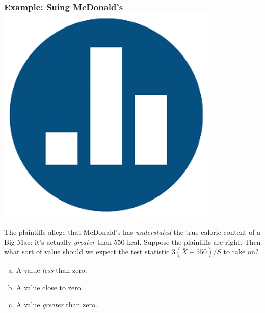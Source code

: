 \begin{frame}
\frametitle{Example: Suing McDonald's \hfill \includegraphics[scale = 0.05]{./images/clicker}}
The plaintiffs allege that McDonald's has \emph{understated} the true caloric content of a Big Mac: it's actually \emph{greater} than 550 kcal. \alert{Suppose the plaintiffs are right. Then what sort of value should we expect the test statistic $3(\bar{X} - 550)/S$ to take on?}

\vspace{1em}
\begin{enumerate}[(a)]
	\item A value \emph{less} than zero.
	\item A value close to zero.
	\item A value \emph{greater} than zero.
\end{enumerate}
\end{frame}
